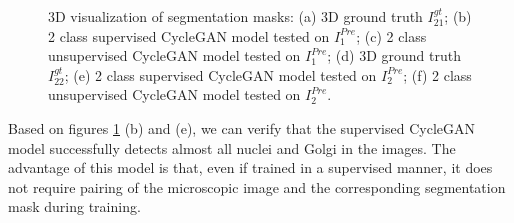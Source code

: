 \begin{figure}[!htb]
\hfil
{}\hfil
{} 

\caption{3D visualization of segmentation masks: (a) 3D ground truth $I^{gt}_{21}$; (b) 2 class supervised CycleGAN model tested on $I^{Pre}_1$; (c) 2 class unsupervised CycleGAN model tested on $I^{Pre}_1$; (d) 3D ground truth $I^{gt}_{22}$; (e) 2 class supervised CycleGAN model tested on $I^{Pre}_2$; (f) 2 class unsupervised CycleGAN model tested on $I^{Pre}_2$.}

\label{fig:results-cyclegan-2channel}

\end{figure}

Based on figures \ref{fig:results-cyclegan-2channel} (b) and (e), we can verify that the supervised CycleGAN model successfully detects almost all nuclei and Golgi in the images. The advantage of this model is that, even if trained in a supervised manner, it does not require pairing of the microscopic image and the corresponding segmentation mask during training. 


